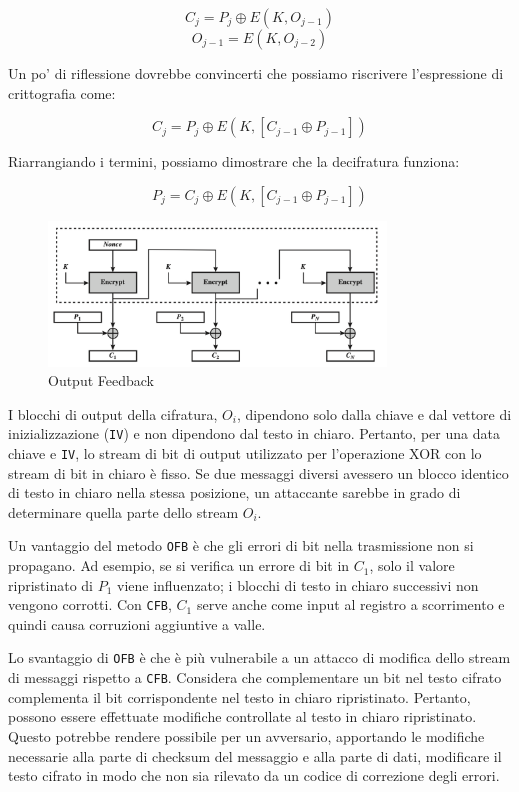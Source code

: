 \[ C_j = P_j \oplus E(K, O_{j-1}) \]
\[ O_{j-1} = E(K, O_{j-2}) \]

Un po' di riflessione dovrebbe convincerti che possiamo riscrivere
l'espressione di crittografia come:

\[ C_j = P_j \oplus E(K, [C_{j-1} \oplus P_{j-1}]) \]

Riarrangiando i termini, possiamo dimostrare che la decifratura funziona:

\[ P_j = C_j \oplus E(K, [C_{j-1} \oplus P_{j-1}]) \]

\begin{figure}[H]
    \centering
    \includegraphics[width=0.8\textwidth]{img/outputFeedback.png}
    \caption{Output Feedback}
    \label{fig:outputFeedback}
\end{figure}
I blocchi di output della cifratura, \(O_i\), dipendono solo dalla chiave
e dal vettore di inizializzazione (\verb|IV|) e non dipendono dal testo
in chiaro. Pertanto, per una data chiave e \verb|IV|, lo stream di bit di
output utilizzato per l'operazione XOR con lo stream di bit in chiaro è fisso.
Se due messaggi diversi avessero un blocco identico di testo in chiaro
nella stessa posizione, un attaccante sarebbe in grado di determinare
quella parte dello stream \(O_i\).

Un vantaggio del metodo \verb|OFB| è che gli errori di bit nella trasmissione non
si propagano. Ad esempio, se si verifica un errore di bit in \(C_1\), solo
il valore ripristinato di \(P_1\) viene influenzato; i blocchi di testo in
chiaro successivi non vengono corrotti. Con \verb|CFB|, \(C_1\) serve anche come
input al registro a scorrimento e quindi causa corruzioni aggiuntive a valle.

Lo svantaggio di \verb|OFB| è che è più vulnerabile a un attacco di modifica dello
stream di messaggi rispetto a \verb|CFB|. Considera che complementare un bit nel
testo cifrato complementa il bit corrispondente nel testo in chiaro
ripristinato. Pertanto, possono essere effettuate modifiche controllate
al testo in chiaro ripristinato. Questo potrebbe rendere possibile per un
avversario, apportando le modifiche necessarie alla parte di checksum del
messaggio e alla parte di dati, modificare il testo cifrato in modo che non
sia rilevato da un codice di correzione degli errori.

